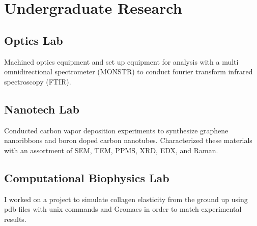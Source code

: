 \documentclass[../resume.tex]{subfiles}
\begin{document}
\section{Undergraduate Research}

\subsection{Optics Lab}
Machined optics equipment and set up equipment for analysis with a multi omnidirectional spectrometer (MONSTR) to conduct fourier transform infrared spectroscopy (FTIR).

\subsection{Nanotech Lab}
Conducted carbon vapor deposition experiments to synthesize graphene nanoribbons and boron doped carbon nanotubes.  Characterized these materials with an assortment of SEM, TEM, PPMS, XRD, EDX, and Raman. 

\subsection{Computational Biophysics Lab}
I worked on a project to simulate collagen elasticity from the ground up using pdb files with unix commands and Gromacs in order to match experimental results.
\end{document}
